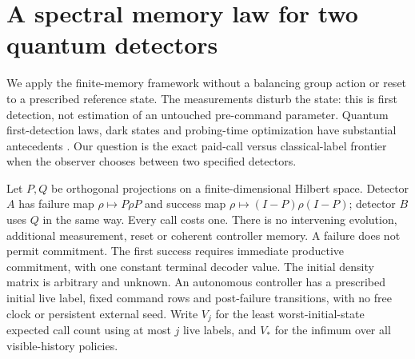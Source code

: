 \section{A spectral memory law for two quantum detectors}\label{sec:two-detectors}
We apply the finite-memory framework without a balancing group action or reset to a prescribed reference state. The measurements disturb the state: this is first detection, not estimation of an untouched pre-command parameter. Quantum first-detection laws, dark states and probing-time optimization have substantial antecedents \cite{Kessler21,DelVecchio26}. Our question is the exact paid-call versus classical-label frontier when the observer chooses between two specified detectors.

Let $P,Q$ be orthogonal projections on a finite-dimensional Hilbert space. Detector $A$ has failure map $\rho\mapsto P\rho P$ and success map $\rho\mapsto(I-P)\rho(I-P)$; detector $B$ uses $Q$ in the same way. Every call costs one. There is no intervening evolution, additional measurement, reset or coherent controller memory. A failure does not permit commitment. The first success requires immediate productive commitment, with one constant terminal decoder value. The initial density matrix is arbitrary and unknown. An autonomous controller has a prescribed initial live label, fixed command rows and post-failure transitions, with no free clock or persistent external seed. Write $V_j$ for the least worst-initial-state expected call count using at most $j$ live labels, and $V_*$ for the infimum over all visible-history policies.

